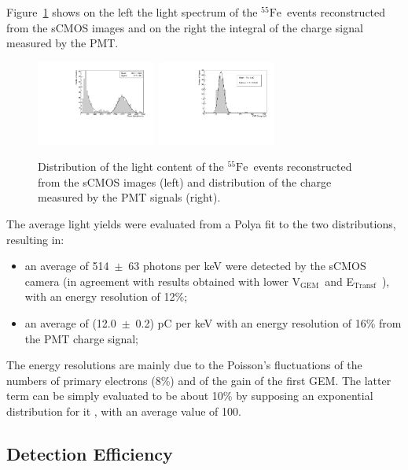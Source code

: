 \documentclass[physics,article,submit,moreauthors,pdftex]{Definitions/mdpi}
\newcommand{\fe}{\ensuremath{^{55}\textrm{Fe}}\xspace}
\newcommand{\Et}  {E$_{\mathrm{Transf}}$\xspace}
\newcommand{\Vg}  {V$_{\mathrm{GEM}}$\xspace}
\begin{document}
Figure~\ref{fig:light} shows on the left the light spectrum of the \fe\ events reconstructed from the sCMOS images and on the right the integral of the charge signal measured by the PMT.

\begin{figure}[t!]
\centering
\includegraphics[width=0.35\textwidth]{DB_Integral_6040.pdf}
\includegraphics[width=0.35\textwidth]{newlightCharge_Run1834_Mix60-40.pdf}
\caption{Distribution of the light content of the \fe~events reconstructed from the sCMOS images  (left) and distribution of the charge measured by the PMT signals (right).} 
\label{fig:light}
\end{figure}

The average light yields were evaluated from a Polya fit \cite{bib:rolandiblum} to the two distributions, resulting in:
\begin{itemize}
    \item an average of 514~$\pm$~63 photons per keV were detected by the sCMOS camera (in agreement with results obtained with lower \Vg\ and \Et\ \cite{bib:fe55}), with an energy resolution of 12\%;
    \item an average of (12.0~$\pm$~0.2) pC per keV with an energy resolution of 16\% from the PMT charge signal;
\end{itemize}

The energy resolutions are mainly due to the Poisson's fluctuations of the numbers of primary electrons (8\%) and of the gain of the first GEM.
The latter term can be simply evaluated to be about 10\% by supposing an exponential distribution for it \cite{bib:thesis}, with an average value of 100.

\subsection{Detection Efficiency}
\end{document}
